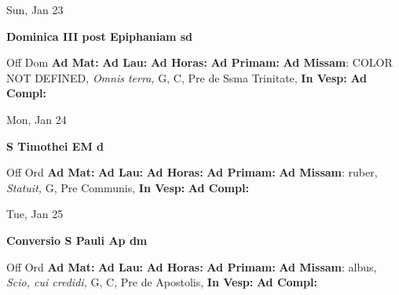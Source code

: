 \documentclass[10pt]{book}
\begin{document}
\begin{center}
\begin{minipage}{3.5in}
\vspace{2em}
\begin{center}Sun, Jan 23
\end{center}
\textbf{ \large Dominica III post Epiphaniam
\textnormal{\normalsize sd}}

\begin{justify}Off Dom
\textbf{Ad Mat: }
\textbf{Ad Lau: }
\textbf{Ad Horas: }
\textbf{Ad Primam: }\textbf{Ad Missam}: COLOR NOT DEFINED, \textit{Omnis terra,} G, C, Pre de Ssma Trinitate, 
\textbf{In Vesp: }
\textbf{Ad Compl: }
\end{justify}
\end{minipage}
\end{center}

\begin{center}
\begin{minipage}{3.5in}
\vspace{2em}
\begin{center}Mon, Jan 24
\end{center}
\textbf{ \large S Timothei EM
\textnormal{\normalsize d}}

\begin{justify}Off Ord
\textbf{Ad Mat: }
\textbf{Ad Lau: }
\textbf{Ad Horas: }
\textbf{Ad Primam: }\textbf{Ad Missam}: ruber, \textit{Statuit,} G, Pre Communis, 
\textbf{In Vesp: }
\textbf{Ad Compl: }
\end{justify}
\end{minipage}
\end{center}

\begin{center}
\begin{minipage}{3.5in}
\vspace{2em}
\begin{center}Tue, Jan 25
\end{center}
\textbf{ \large Conversio S Pauli Ap
\textnormal{\normalsize dm}}

\begin{justify}Off Ord
\textbf{Ad Mat: }
\textbf{Ad Lau: }
\textbf{Ad Horas: }
\textbf{Ad Primam: }\textbf{Ad Missam}: albus, \textit{Scio, cui credidi,} G, C, Pre de Apostolis, 
\textbf{In Vesp: }
\textbf{Ad Compl: }
\end{justify}
\end{minipage}
\end{center}
\end{document}
